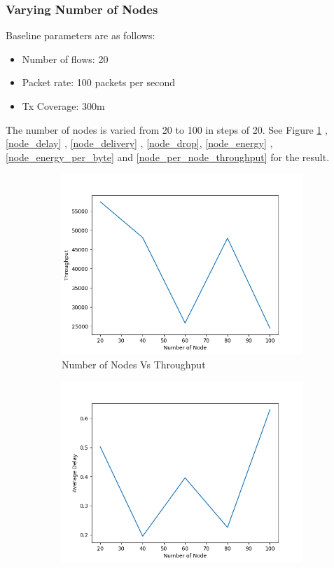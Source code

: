 \subsubsection{Varying Number of Nodes}
Baseline parameters are as follows:
\begin{itemize}
    \item Number of flows: 20
    \item Packet rate: 100 packets per second
    \item Tx Coverage: 300m
\end{itemize}
The number of nodes is varied from 20 to 100 in steps of 20.
See Figure \ref{node_throughput} ,\ref{node_delay} , \ref{node_delivery} , \ref{node_drop}, \ref{node_energy} , \ref{node_energy_per_byte} and \ref{node_per_node_throughput} for the result.
\begin{figure}[h]
\begin{subfigure}{.5\textwidth}
  \centering
  \includegraphics[width=.8\linewidth]{_15_4_static/NumberofNodevsThroughput.png}
     \caption{Number of Nodes Vs Throughput}
    \label{node_throughput}
\end{subfigure}
\begin{subfigure}{.5\textwidth}
  \centering
  \includegraphics[width=.8\linewidth]{_15_4_static/NumberofNodevsAverageDelay.png}

\end{subfigure}
\end{figure}
